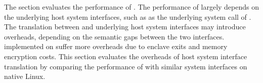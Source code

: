 The section evaluates the performance of \thehostabi{}.
The performance of \hostapis{} largely depends on the underlying host system interfaces,
such as  as the underlying system call of .
The translation between \hostapis{} and underlying host system interfaces may introduce overheads,
depending on the semantic gaps between the two interfaces.
\hostapis{} implemented on \sgx{}
suffer more overheads due to
enclave exits and memory encryption costs.
This section
evaluates the overheads of host system interface translation
by comparing the performance of \hostapis{}
with similar system interfaces on native Linux.


